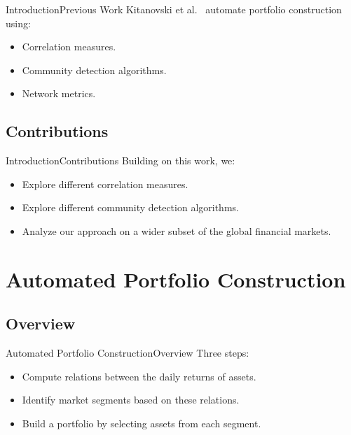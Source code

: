 \documentclass[bigger]{beamer}
\begin{document}
\begin{frame}{Introduction}{Previous Work}
    Kitanovski et al.~\cite{kitanovski} automate portfolio construction using:
    \begin{itemize}
        \item<2-> Correlation measures.
        \item<3-> Community detection algorithms.
        \item<4-> Network metrics.
    \end{itemize}
\end{frame}

\subsection{Contributions}

\begin{frame}{Introduction}{Contributions}
    Building on this work, we:
    \begin{itemize}
        \item<2-> Explore different correlation measures.
        \item<3-> Explore different community detection algorithms.
        \item<4-> Analyze our approach on a wider subset of the global financial markets.
    \end{itemize}
\end{frame}


\section{Automated Portfolio Construction}

\subsection{Overview}

\begin{frame}{Automated Portfolio Construction}{Overview}
    Three steps:
    \begin{itemize}
        \item<2-> Compute relations between the daily returns of assets.
        \item<3-> Identify market segments based on these relations.
        \item<4-> Build a portfolio by selecting assets from each segment.
    \end{itemize}
\end{frame}
\end{document}
